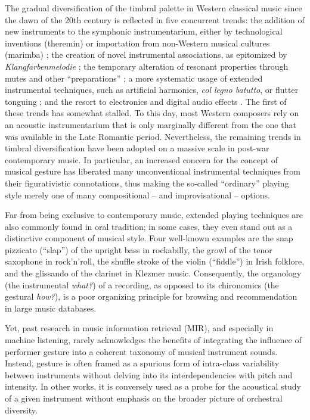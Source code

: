 The gradual diversification of the timbral palette in Western classical music since the dawn of the 20th century is reflected in five concurrent trends:
the addition of new instruments to the symphonic instrumentarium, either by technological inventions (\eg theremin) or importation from non-Western musical cultures (\eg marimba) \cite[epilogue]{sachs2012book};
the creation of novel instrumental associations, as epitomized by \emph{Klangfarbenmelodie} \cite[chapter 22]{schoenberg2010book};
the temporary alteration of resonant properties through mutes and other ``preparations'' \cite{dianova2007phd};
a more systematic usage of extended instrumental techniques, such as artificial harmonics, \emph{col legno batutto}, or flutter tonguing \cite[chapter 11]{kostka2016book};
and the resort to electronics and digital audio effects \cite{zolzer2011dafx}.
The first of these trends has somewhat stalled.
To this day, most Western composers rely on an acoustic instrumentarium that is only marginally different from the one that was available in the Late Romantic period.
Nevertheless, the remaining trends in timbral diversification have been adopted on a massive scale in post-war contemporary music.
In particular, an increased concern for the concept of musical gesture \cite{godoy2009book} has liberated many unconventional instrumental techniques from their figurativistic connotations, thus making the so-called ``ordinary'' playing style merely one of many compositional -- and improvisational -- options.

Far from being exclusive to contemporary music, extended playing techniques are also commonly found in oral tradition; in some cases, they even stand out as a distinctive component of musical style.
Four well-known examples are
the snap pizzicato (``slap'') of the upright bass in rockabilly,
the growl of the tenor saxophone in rock'n'roll,
the shuffle stroke of the violin (``fiddle'') in Irish folklore,
and the glissando of the clarinet in Klezmer music.
Consequently, the organology (the instrumental \emph{what?}) of a recording, as opposed to its chironomics (the gestural \emph{how?}), is a poor organizing principle for browsing and recommendation in large music databases.

Yet, past research in music information retrieval (MIR), and especially in machine listening, rarely acknowledges the benefits of integrating the influence of performer gesture into a coherent taxonomy of musical instrument sounds.
Instead, gesture is often framed as a spurious form of intra-class variability between instruments without delving into its interdependencies with pitch and intensity.
In other works, it is conversely used as a probe for the acoustical study of a given instrument without emphasis on the broader picture of orchestral diversity.

